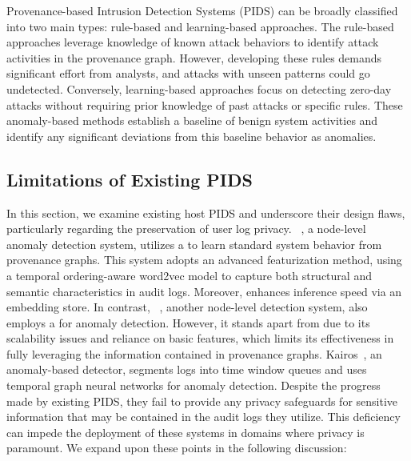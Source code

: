 
Provenance-based Intrusion Detection Systems (PIDS) can be broadly classified into two main types: rule-based and learning-based approaches. The rule-based approaches leverage knowledge of known attack behaviors to identify attack activities in the provenance graph. However, developing these rules demands significant effort from analysts, and attacks with unseen patterns could go undetected. Conversely, learning-based approaches focus on detecting zero-day attacks without requiring prior knowledge of past attacks or specific rules. These anomaly-based methods establish a baseline of benign system activities and identify any significant deviations from this baseline behavior as anomalies.

\subsection{Limitations of Existing PIDS}
In this section, we examine existing host PIDS and underscore their design flaws, particularly regarding the preservation of user log privacy. \flash~\cite{flash2024}, a node-level anomaly detection system, utilizes a \gnn to learn standard system behavior from provenance graphs. This system adopts an advanced featurization method, using a temporal ordering-aware word2vec model to capture both structural and semantic characteristics in audit logs. Moreover, \flash enhances inference speed via an \gnnshort embedding store. In contrast, \threatrace~\cite{wang2022threatrace}, another node-level detection system, also employs a \gnn for anomaly detection. However, it stands apart from \flash due to its scalability issues and reliance on basic features, which limits its effectiveness in fully leveraging the information contained in provenance graphs. Kairos~\cite{cheng2023kairos}, an anomaly-based detector, segments logs into time window queues and uses temporal graph neural networks for anomaly detection. Despite the progress made by existing PIDS, they fail to provide any privacy safeguards for sensitive information that may be contained in the audit logs they utilize. This deficiency can impede the deployment of these systems in domains where privacy is paramount. We expand upon these points in the following discussion: 

